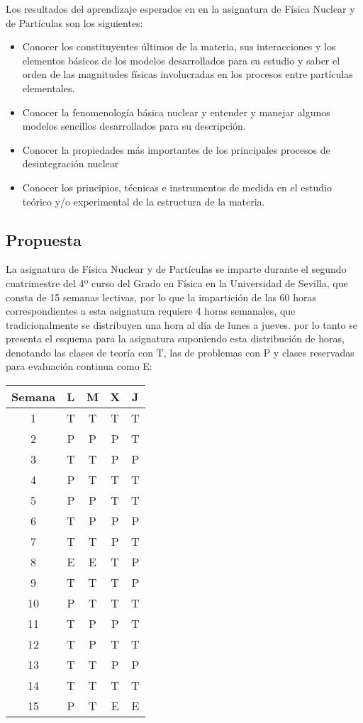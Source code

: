 \documentclass[a4paper,12pt,twoside]{article}
\begin{document}
Los resultados del aprendizaje esperados en en la asignatura de Física Nuclear y de Partículas son los siguientes:
\begin{itemize}
\item Conocer los constituyentes últimos de la materia, sus interacciones y los elementos básicos de los modelos
desarrollados para su estudio y saber el orden de las magnitudes físicas involucradas en los procesos entre partículas
elementales. 
\item Conocer la fenomenología básica nuclear y entender y manejar algunos modelos sencillos desarrollados para su
descripción.
\item  Conocer la propiedades más importantes de los principales procesos de desintegración nuclear
\item Conocer los principios, técnicas e instrumentos de medida en el estudio teórico y/o experimental de la estructura de la
materia. 
\end{itemize}

\subsection{Propuesta}

La asignatura de Física Nuclear y de Partículas se imparte durante el segundo cuatrimestre del 4º curso del Grado en Física en la Universidad de Sevilla, que consta de 15 semanas lectivas, por lo que la impartición de las 60 horas correspondientes a esta asignatura requiere 4 horas semanales, que tradicionalmente se distribuyen una hora al día de lunes a jueves. por lo tanto se presenta el esquema para la asignatura suponiendo esta distribución de horas, denotando las clases de teoría con T, las de problemas con P y clases reservadas para evaluaci\'on continua como E:

\begin{table}[h]
\begin{center}
\begin{tabular}{|c|c|c|c|c|}
\hline
Semana & L & M & X & J \\
\hline\hline
1& T &T&T&T\\
\hline
2& P &P&P&T\\
\hline
3& T &T&P&P\\
\hline
4&P& T &T&T\\
\hline 5&P&P&T&T\\
\hline 6&T&P&P&P\\
\hline 7&T&T&P&T\\
\hline 8&E&E&T&P\\
\hline 9&T&T&T&P\\
\hline 10&P&T&T&T\\
\hline 11&T&P&P&T\\
\hline 12&T&P&T&T\\
\hline 13&T&T&P&P\\
\hline 14&T&T&T&T\\
\hline 15&P&T&E&E\\
\hline \end{tabular}
\end{center}
\end{table}
\end{document}
